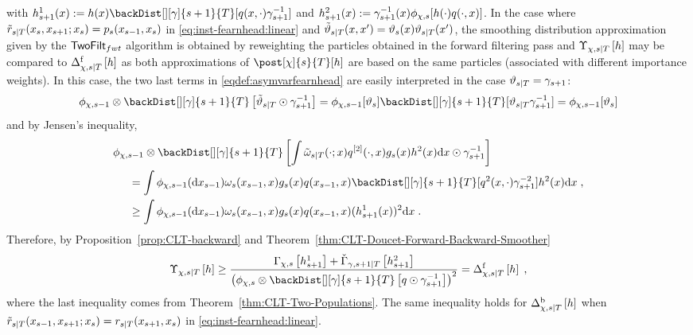 with $h^1_{s+1}(x)\eqdef h(x)\backDist[][\gamma]{s+1}{T}[q(x,\cdot)\gamma_{s+1}^{-1}]$ and $h^2_{s+1}(x)\eqdef \gamma_{s+1}^{-1}(x)\filt{\Xinit,s}[h(\cdot)q(\cdot,x)]$. In the case where $\kiss[smooth]{s}{T}(x_s,x_{s+1}; x_s) = \kissforward{s}{s}(x_{s-1}, x_s)$ in \eqref{eq:inst-fearnhead:linear} and $\adjfunc[smooth]{s}{T}{x,x'} = \adjfuncforward{s}(x)\adjfunc{s}{T}{x'}$, the smoothing distribution approximation given by the $\mathsf{TwoFilt}_{fwt}$ algorithm is obtained by reweighting the particles obtained in the forward filtering pass and $\asymVarFearnhead[\Xinit]{s}{T}{h}$ may be compared to $\asymVarDoucet[\Xinit]{\forward}{s}{T}{h}$ as both approximations of $\post[\Xinit]{s}{T}[h]$ are based on the same particles (associated with different importance weights). In this case, the two last terms in \eqref{eqdef:asymvarfearnhead} are easily interpreted in the case  $\adjfunc{s}{T}{} = \gamma_{s+1}$:
\[
\filt{\Xinit,s-1} \otimes \backDist[][\gamma]{s+1}{T} \left[\adjfunc[smooth]{s}{T}{} \odot \fakeprior^{-1}_{s+1} \right] = \filt{\Xinit,s-1}[ \adjfuncforward{s}]\backDist[][\gamma]{s+1}{T}[\adjfunc{s}{T}{}\fakeprior^{-1}_{s+1}] = \filt{\Xinit,s-1}[ \adjfuncforward{s}]
\]
and by Jensen's inequality,
\begin{align*}
&\filt{\Xinit,s-1} \otimes \backDist[][\gamma]{s+1}{T}\left[ \int \smwghtfunc{s}{T}(\cdot;x) q^{[2]}(\cdot,x) g_s(x) h^2(x) \rmd x \odot \fakeprior^{-1}_{s+1} \right] \\
&\hspace{.5cm}= \int \filt{\Xinit,s-1}(\rmd x_{s-1})\omega_s(x_{s-1},x)g_s(x)q(x_{s-1},x)\backDist[][\gamma]{s+1}{T}[q^2(x,\cdot)\gamma_{s+1}^{-2}]h^2(x) \rmd x\eqsp,\\
&\hspace{.5cm}\ge \int \filt{\Xinit,s-1}(\rmd x_{s-1})\omega_s(x_{s-1},x)g_s(x)q(x_{s-1},x)(h^1_{s+1}(x))^2 \rmd x\eqsp.
\end{align*}
Therefore, by Proposition~\ref{prop:CLT-backward} and Theorem~\ref{thm:CLT-Doucet-Forward-Backward-Smoother}
\[
\asymVarFearnhead[\Xinit]{s}{T}{h} \ge \frac{\asymVar[\Xinit]{s}{h^1_{s+1}} + \backasymVar[\gamma]{s+1}{T}{h^2_{s+1}}}{\left(\filt{\Xinit,s} \otimes \backDist[][\gamma]{s+1}{T} \left[q\odot \fakeprior_{s+1}^{-1} \right]\right)^2}=\asymVarDoucet[\Xinit]{\forward}{s}{T}{h}\eqsp,
\]
where the last inequality comes from Theorem~\ref{thm:CLT-Two-Populations}. The same inequality holds for $\asymVarDoucet[\Xinit]{\backward}{s}{T}{h}$ when $\kiss[smooth]{s}{T}(x_{s-1},x_{s+1}; x_s) = \kiss{s}{T}(x_{s+1}, x_s)$ in \eqref{eq:inst-fearnhead:linear}.


